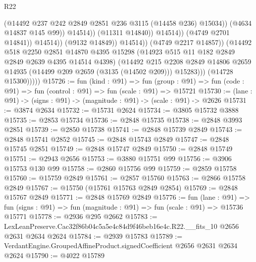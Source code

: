 \begin{lexlean}{R22}
\begin{coremodule}
                                          (@14492
                                            @237
                                            @242
                                            @2849
                                            @2851
                                            @236
                                            @3115
                                            (@14458 @236)
                                            @15034))
                                        (@4634 @14837 @145 @99))
                                      @14514))
                                  (@11311 @14840))
                                @14514))
                            (@4749 @2701 @14841))
                          @14514))
                      (@9132 @14849))
                    @14514))
                (@4749 @2217 @14857))
              (@14492
                @518
                @2250
                @2851
                @14870
                @4395
                @15298
                (@14923 @515 @11 @182 @2849 @2849 @2639 @4395 @14514 @4398)
                (@14492
                  @215
                  @2208
                  @2849
                  @14806
                  @2659
                  @14935
                  (@14499 @209 @2659 (@3135 (@14502 @209)))
                  @15283)))
            (@14728 @15300)))))
@15726 := fun (kind : @91) =>
  fun (group : @91) => fun (code : @91) => fun (control : @91) => fun (scale : @91) => @15721
@15730 := (lane : @91) -> (signs : @91) -> (magnitude : @91) -> (scale : @91) -> @2626
@15731 := @3874 @2634
@15732 := @15731 @2624
@15734 := @3805 @15732 @3888
@15735 := @2853 @15734
@15736 := @2848 @15735
@15738 := @2848 @3993 @2851
@15739 := @2850 @15738
@15741 := @2848 @15739 @2849
@15743 := @2848 @15741 @2852
@15745 := @2848 @15743 @2849
@15747 := @2848 @15745 @2851
@15749 := @2848 @15747 @2849
@15750 := @2848 @15749
@15751 := @2943 @2656
@15753 := @3880 @15751 @99
@15756 := @3906 @15753 @130 @99
@15758 := @2860 @15756 @99
@15759 := @2859 @15758
@15760 := @15759 @2849
@15761 := @2857 @15760
@15763 := @2866 @15758 @2849
@15767 := @15750 (@15761 @15763 @2849 @2854)
@15769 := @2848 @15767 @2849
@15771 := @2848 @15769 @2849
@15776 := fun (lane : @91) =>
  fun (signs : @91) => fun (magnitude : @91) => fun (scale : @91) => @15736 @15771
@15778 := @2936 @295 @2662
@15783 := LexLeanPreserve.Cac32f86b04c5a5e4c84d9f46beb16e4c.R22.__fits_10 @2656 @2631 @2634 @2624
@15784 := @2939 @15783
@15789 := VerdantEngine.GroupedAffineProduct.signedCoefficient @2656 @2631 @2634 @2624
@15790 := @4022 @15789

\end{coremodule}
\end{lexlean}
